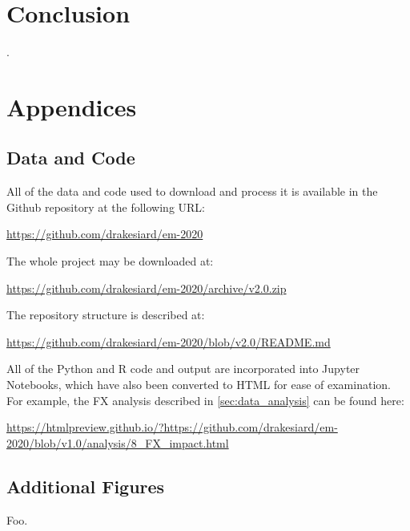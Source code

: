 \documentclass[12pt,a4paper]{article}
\begin{document}
\section{Conclusion}\label{sec:conclusion}

\clearpage

\appendix

\renewcommand{\refname}{\section{References}\label{sec:references}}.


\clearpage

\section{Appendices}

\subsection{Data and Code}\label{sec:data_and_code}

All of the data and code used to download and process it is available in the Github repository at the following URL:

\url{https://github.com/drakesiard/em-2020}

\noindent
The whole project may be downloaded at:

\url{https://github.com/drakesiard/em-2020/archive/v2.0.zip}

\noindent
The repository structure is described at:

\url{https://github.com/drakesiard/em-2020/blob/v2.0/README.md}

\noindent
All of the Python and R code and output are incorporated into Jupyter Notebooks, which have also been converted to HTML for ease of examination. For example, the FX analysis described in \cref{sec:data_analysis} can be found here:

\begin{adjustbox}{max width=\textwidth}
\url{https://htmlpreview.github.io/?https://github.com/drakesiard/em-2020/blob/v1.0/analysis/8_FX_impact.html}
\end{adjustbox}

\clearpage
\subsection{Additional Figures}\label{sec:graph_appendix}
Foo.
\end{document}
